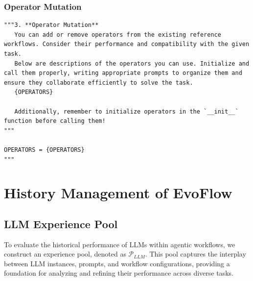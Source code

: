 \documentclass{article}
\theoremstyle{plain}
\theoremstyle{definition}
\theoremstyle{remark}
\newcommand{\ourmethod}{{\fontfamily{lmtt}\selectfont \textbf{EvoFlow}}\xspace}
\begin{document}
\subsubsection{Operator Mutation}\label{app:change_topo}




\begin{tcolorbox}[notitle, sharp corners, breakable, colframe=YellowGreen, colback=white, 
       boxrule=3pt, boxsep=0.5pt, enhanced, 
       shadow={3pt}{-3pt}{0pt}{opacity=1,mygrey},
       title={Operator Mutation},]\label{box:tag-generate}
       \footnotesize
       {\selectfont
\begin{lstlisting}
"""3. **Operator Mutation**  
   You can add or remove operators from the existing reference workflows. Consider their performance and compatibility with the given task.  
   Below are descriptions of the operators you can use. Initialize and call them properly, writing appropriate prompts to organize them and ensure they collaborate efficiently to solve the task.
   {OPERATORS}

   Additionally, remember to initialize operators in the `__init__` function before calling them!
"""

OPERATORS = {OPERATORS}
"""
\end{lstlisting}
}
\end{tcolorbox}

\section{History Management of \ourmethod}\label{app:history}

\subsection{LLM Experience Pool}\label{app:llm_pool}

To evaluate the historical performance of LLMs within agentic workflows, we construct an experience pool, denoted as \(\mathcal{P}_{LLM}\). This pool captures the interplay between LLM instances, prompts, and workflow configurations, providing a foundation for analyzing and refining their performance across diverse tasks.
\end{document}
